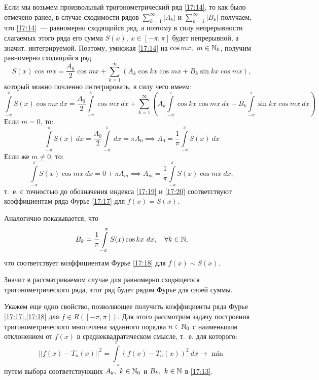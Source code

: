 \documentclass[../../main.tex]{subfiles}
\begin{document}
Если мы возьмем произвольный 
тригонометрический ряд \eqref{17:14}, то как было отмечено ранее, в случае 
сходимости рядов
$\sum\limits_{k=1}^{\infty} \left| A_k \right|$ и $\sum\limits_{k=1}^{\infty} 
\left| B_k \right|$ получаем, что
\eqref{17:14}~--- равномерно сходящийся ряд, а поэтому в силу непрерывности 
слагаемых этого ряда его сумма $S(x),\ x\in\left[ -\pi,\pi \right] $ будет 
непрерывной, а значит, интегрируемой.
Поэтому, умножая \eqref{17:14} на $\cos{mx},\ m \in \mathbb{N}_0$, получим равномерно 
сходящийся ряд
\[  S(x) \cos{mx} =  \frac{A_0}{2} \cos{mx} + \sum_{k=1}^{\infty}  \left( A_k 
\cos{kx} \cos{mx} + B_k \sin{kx} \cos{mx} \right), \]
который можно почленно интегрировать, в силу чего имеем:
\[  \int\limits_{-\pi}^{\pi} S(x) \cos{mx} \ dx = 
\frac{A_0}{2}\int\limits_{-\pi}^{\pi} \cos{mx} \ dx + \sum_{k=1}^{\infty}  
\left( A_k \int\limits_{-\pi}^{\pi} \cos{kx} \cos{mx} \ dx + B_k 
\int\limits_{-\pi}^{\pi} \sin{kx} \cos{mx} \ dx \right)  \]
Если $m=0$, то:
\begin{equation}
\label{17:19}
\int\limits_{-\pi}^{\pi} S(x) \ dx = \frac{A_0}{2}\int\limits_{-\pi}^{\pi} \ 
dx  = \pi A_0  \implies A_0 = \frac{1}{\pi} \int\limits_{-\pi}^{\pi} S(x) \ dx
\end{equation}
Если же $m \ne 0$, то:
\begin{equation}
\label{17:20}
\int\limits_{-\pi}^{\pi} S(x) \cos{mx} \ dx = 0 + \pi A_m \implies A_m = 
\frac{1}{\pi} \int\limits_{-\pi}^{\pi} S(x) \cos{mx} \ dx,
\end{equation}
т.~е. с точностью до обозначения индекса \eqref{17:19} и \eqref{17:20} 
соответствуют коэффициентам ряда Фурье \eqref{17:17} для $f(x) = S(x)$.

Аналогично показывается, что
\begin{equation}
\label{17:21}
B_k = \frac{1}{\pi} \int\limits_{-\pi}^{\pi} S(x) \cos{kx} \ dx, \quad 
\forall k \in \mathbb{N},
\end{equation}
что соответствует коэффициентам Фурье \eqref{17:18} для $f(x) \sim S(x)$. 

Значит в рассматриваемом случае для равномерно сходящегося тригонометрического 
ряда, этот ряд будет рядом Фурье для своей суммы.

Укажем еще одно свойство, позволяющее получить коэффициенты ряда Фурье 
\eqref{17:17},\eqref{17:18} для $f \in R\left( \left[ -\pi,\pi\right]  
\right).$ Для этого рассмотрим задачу построения тригонометрического 
многочлена заданного порядка $n \in \mathbb{N}_0$ с наименьшим отклонением от $f(x)$ в 
среднеквадратическом смысле, т.~е. для которого:
\begin{equation}
\label{17:22}
\left|| f(x) -T_n(x) |\right| ^2 = \int \limits_{-\pi}^{\pi} \left( f(x) - 
T_n(x)\right)^2 \ dx \to \min
\end{equation}
путем выбора соответствующих $A_k,\ k \in \mathbb{N}_0$ и $B_k,\ k \in \mathbb{N}$ в 
\eqref{17:13}.
\end{document}
